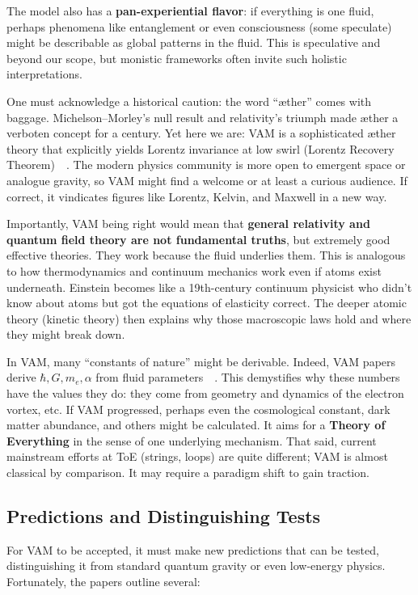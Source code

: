 \documentclass[a4paper,12pt]{article}
\begin{document}
    The model also has a \textbf{pan-experiential flavor}: if everything is one fluid, perhaps phenomena like entanglement or even consciousness (some speculate) might be describable as global patterns in the fluid. This is speculative and beyond our scope, but monistic frameworks often invite such holistic interpretations.

    One must acknowledge a historical caution: the word “æther” comes with baggage. Michelson–Morley’s null result and relativity’s triumph made æther a verboten concept for a century. Yet here we are: VAM is a sophisticated æther theory that explicitly yields Lorentz invariance at low swirl (Lorentz Recovery Theorem)~\cite{reference_236}~\cite{reference_237}. The modern physics community is more open to emergent space or analogue gravity, so VAM might find a welcome or at least a curious audience. If correct, it vindicates figures like Lorentz, Kelvin, and Maxwell in a new way.

    Importantly, VAM being right would mean that \textbf{general relativity and quantum field theory are not fundamental truths}, but extremely good effective theories. They work because the fluid underlies them. This is analogous to how thermodynamics and continuum mechanics work even if atoms exist underneath. Einstein becomes like a 19th-century continuum physicist who didn’t know about atoms but got the equations of elasticity correct. The deeper atomic theory (kinetic theory) then explains why those macroscopic laws hold and where they might break down.

    In VAM, many “constants of nature” might be derivable. Indeed, VAM papers derive $\hbar, G, m_e, \alpha$ from fluid parameters~\cite{reference_238}~\cite{reference_239}. This demystifies why these numbers have the values they do: they come from geometry and dynamics of the electron vortex, etc. If VAM progressed, perhaps even the cosmological constant, dark matter abundance, and others might be calculated. It aims for a \textbf{Theory of Everything} in the sense of one underlying mechanism. That said, current mainstream efforts at ToE (strings, loops) are quite different; VAM is almost classical by comparison. It may require a paradigm shift to gain traction.

    \subsection{Predictions and Distinguishing Tests}
    For VAM to be accepted, it must make new predictions that can be tested, distinguishing it from standard quantum gravity or even low-energy physics. Fortunately, the papers outline several:
\end{document}
